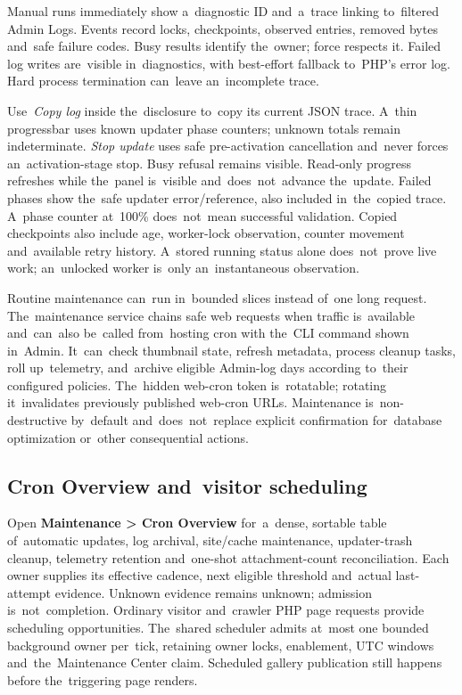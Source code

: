 \documentclass[11pt,a4paper]{article}
\newcommand{\ui}[1]{\textbf{#1}}
\begin{document}
Manual runs immediately show a~diagnostic ID and~a~trace linking to~filtered
Admin Logs. Events record locks, checkpoints, observed entries, removed bytes
and~safe failure codes. Busy results identify the~owner; force respects it.
Failed log writes are~visible in~diagnostics, with best-effort fallback
to~PHP's error log. Hard process termination can~leave an~incomplete trace.

Use~\emph{Copy log} inside the~disclosure to~copy its current JSON trace.
A~thin progressbar uses known updater phase counters; unknown totals remain
indeterminate. \emph{Stop update} uses safe pre-activation cancellation
and~never
forces an~activation-stage stop. Busy refusal remains visible. Read-only
progress
refreshes while the~panel is~visible and~does~not~advance the~update.
Failed phases show the~safe updater error/reference, also included in~the~copied
trace. A~phase counter at~100\% does~not~mean successful validation.
Copied checkpoints also include age, worker-lock observation, counter movement
and~available retry history. A~stored running status alone does~not~prove live
work; an~unlocked worker is~only an~instantaneous observation.

Routine maintenance can~run in~bounded slices instead of~one long request.
The~maintenance service chains safe web requests when traffic is~available
and~can~also be~called from~hosting cron with the~CLI command shown in~Admin.
It~can~check thumbnail state, refresh metadata, process cleanup tasks, roll
up~telemetry, and~archive eligible Admin-log days according to~their configured
policies. The~hidden web-cron token is~rotatable; rotating it~invalidates
previously published web-cron URLs. Maintenance is~non-destructive by~default
and~does~not~replace explicit confirmation for~database optimization or~other
consequential actions.

\subsection{Cron Overview and~visitor scheduling}
Open \ui{Maintenance > Cron Overview} for~a~dense, sortable table of~automatic
updates, log archival, site/cache maintenance, updater-trash cleanup,
telemetry retention and~one-shot attachment-count reconciliation. Each owner
supplies its effective cadence, next eligible threshold and~actual last-attempt
evidence. Unknown evidence remains unknown; admission is~not~completion.
Ordinary visitor and~crawler PHP page requests provide scheduling opportunities.
The~shared scheduler admits at~most one bounded background owner per~tick,
retaining owner locks, enablement, UTC windows and~the~Maintenance Center claim.
Scheduled gallery publication still happens before the~triggering page renders.
\end{document}

